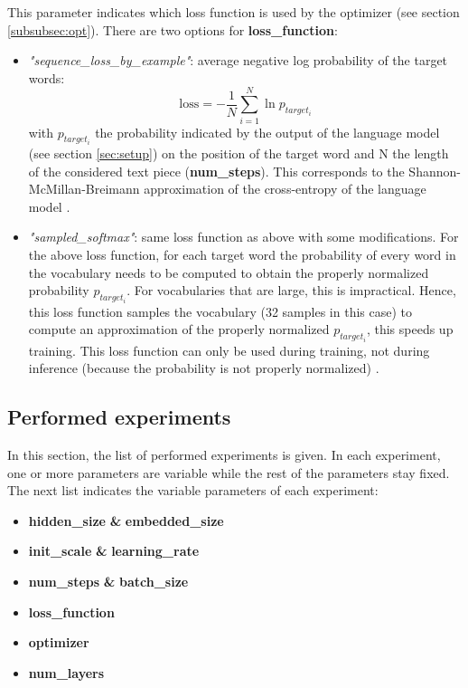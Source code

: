 \documentclass[10pt,a4paper,titlepage]{article}
\begin{document}
This parameter indicates which loss function is used by the optimizer (see section \ref{subsubsec:opt}). There are two options for \textbf{loss\_function}:

\begin{itemize}
	
	\item \textit{"sequence\_loss\_by\_example"}: average negative log probability of the target words:
	\[ \text{loss} = -\frac{1}{N} \sum_{i=1}^{N} \ln p_{target_{i}} \]
	\noindent
	with $p_{target_{i}}$ the probability indicated by the output of the language model (see section \ref{sec:setup}) on the position of the target word and N the length of the considered text piece (\textbf{num\_steps}). This corresponds to the Shannon-McMillan-Breimann approximation of the cross-entropy of the language model \cite{cross}.
	
	\item \textit{"sampled\_softmax"}: same loss function as above with some modifications. For the above loss function, for each target word the probability of every word in the vocabulary needs to be computed to obtain  the properly normalized probability $p_{target_{i}}$. For vocabularies that are large, this is impractical. Hence, this loss function samples the vocabulary (32 samples in this case) to compute an approximation of the properly normalized $p_{target_{i}}$, this speeds up training. This loss function can only be used during training, not during inference (because the probability is not properly normalized) \cite{sampled}.
	
\end{itemize}

\subsection{Performed experiments}
\label{subsec:perf}

In this section, the list of performed experiments is given. In each experiment, one or more parameters are variable while the rest of the parameters stay fixed. The next list indicates the variable parameters of each experiment:

\begin{itemize}
	
	\item \textbf{hidden\_size} \textbf{\&} \textbf{embedded\_size}
	\item \textbf{init\_scale} \textbf{\&} \textbf{learning\_rate}
	\item \textbf{num\_steps} \textbf{\&} \textbf{batch\_size}
	\item \textbf{loss\_function}
	\item \textbf{optimizer}
	\item \textbf{num\_layers}
	
\end{itemize}
\end{document}

